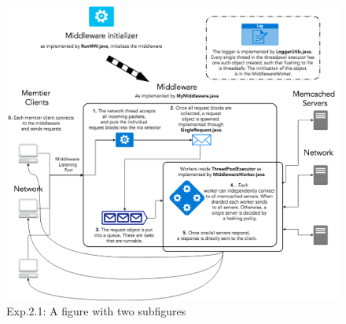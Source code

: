 \documentclass[11pt,a4paper]{article}
\begin{document}
\begin{figure}[H]
\centering
\includegraphics[width=\textwidth]{img/middleware_diagram.png}
\caption{Exp.2.1: A figure with two subfigures}
\label{fig:test}
\end{figure}
\end{document}
